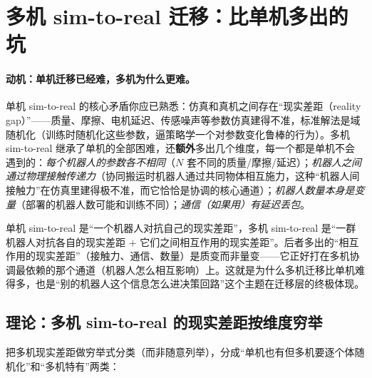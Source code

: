 \section{多机 sim-to-real 迁移：比单机多出的坑}
\label{sec:mc-sim2real}

\paragraph{动机：单机迁移已经难，多机为什么更难。}
单机 sim-to-real 的核心矛盾你应已熟悉：仿真和真机之间存在“现实差距（reality gap）”——质量、摩擦、电机延迟、传感噪声等参数仿真建得不准，标准解法是域随机化（训练时随机化这些参数，逼策略学一个对参数变化鲁棒的行为）。多机 sim-to-real 继承了单机的全部困难，还\textbf{额外}多出几个维度，每一个都是单机不会遇到的：\emph{每个机器人的参数各不相同}（$N$ 套不同的质量/摩擦/延迟）；\emph{机器人之间通过物理接触传递力}（协同搬运时机器人通过共同物体相互施力，这种“机器人间接触力”在仿真里建得极不准，而它恰恰是协调的核心通道）；\emph{机器人数量本身是变量}（部署的机器人数可能和训练不同）；\emph{通信（如果用）有延迟丢包}。

\begin{insight}
单机 sim-to-real 是“一个机器人对抗自己的现实差距”，多机 sim-to-real 是“一群机器人对抗各自的现实差距 $+$ 它们之间相互作用的现实差距”。后者多出的“相互作用的现实差距”（接触力、通信、数量）是质变而非量变——它正好打在多机协调最依赖的那个通道（机器人怎么相互影响）上。这就是为什么多机迁移比单机难得多，也是“别的机器人这个信息怎么进决策回路”这个主题在迁移层的终极体现。
\end{insight}

\subsection{理论：多机 sim-to-real 的现实差距按维度穷举}
\label{sec:mc-dr-list}

把多机现实差距做穷举式分类（而非随意列举），分成“单机也有但多机要逐个体随机化”和“多机特有”两类：

